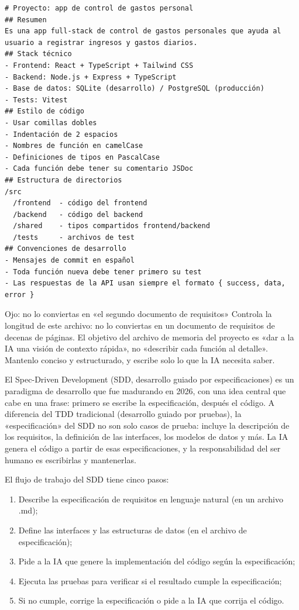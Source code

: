 \begin{lstlisting}
# Proyecto: app de control de gastos personal
## Resumen
Es una app full-stack de control de gastos personales que ayuda al usuario a registrar ingresos y gastos diarios.
## Stack técnico
- Frontend: React + TypeScript + Tailwind CSS
- Backend: Node.js + Express + TypeScript
- Base de datos: SQLite (desarrollo) / PostgreSQL (producción)
- Tests: Vitest
## Estilo de código
- Usar comillas dobles
- Indentación de 2 espacios
- Nombres de función en camelCase
- Definiciones de tipos en PascalCase
- Cada función debe tener su comentario JSDoc
## Estructura de directorios
/src
  /frontend  - código del frontend
  /backend   - código del backend
  /shared    - tipos compartidos frontend/backend
  /tests     - archivos de test
## Convenciones de desarrollo
- Mensajes de commit en español
- Toda función nueva debe tener primero su test
- Las respuestas de la API usan siempre el formato { success, data, error }
\end{lstlisting}

\begin{tcbwarn}{Ojo: no lo conviertas en «el segundo documento de requisitos»}
Controla la longitud de este archivo: no lo conviertas en un documento de requisitos de decenas de páginas. El objetivo del archivo de memoria del proyecto es «dar a la IA una visión de contexto rápida», no «describir cada función al detalle». Mantenlo conciso y estructurado, y escribe solo lo que la IA necesita saber.

\end{tcbwarn}


El Spec-Driven Development (SDD, desarrollo guiado por especificaciones) es un paradigma de desarrollo que fue madurando en 2026, con una idea central que cabe en una frase: primero se escribe la especificación, después el código. A diferencia del TDD tradicional (desarrollo guiado por pruebas), la «especificación» del SDD no son solo casos de prueba: incluye la descripción de los requisitos, la definición de las interfaces, los modelos de datos y más. La IA genera el código a partir de esas especificaciones, y la responsabilidad del ser humano es escribirlas y mantenerlas.

El flujo de trabajo del SDD tiene cinco pasos:

\begin{enumerate}
  \item Describe la especificación de requisitos en lenguaje natural (en un archivo .md);
  \item Define las interfaces y las estructuras de datos (en el archivo de especificación);
  \item Pide a la IA que genere la implementación del código según la especificación;
  \item Ejecuta las pruebas para verificar si el resultado cumple la especificación;
  \item Si no cumple, corrige la especificación o pide a la IA que corrija el código.
\end{enumerate}

